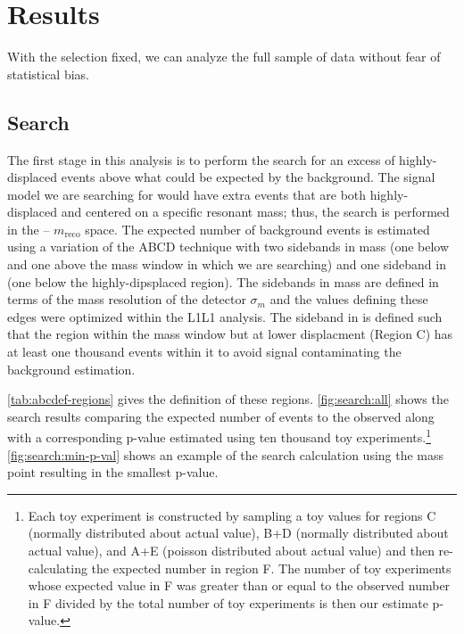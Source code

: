 \section{Results}
With the selection fixed, we can analyze the full sample of data without fear of
statistical bias.

\subsection{Search}
The first stage in this analysis is to perform the search for an excess of highly-displaced
events above what could be expected by the background.
The signal model we are searching for would have extra events that are both highly-displaced
and centered on a specific resonant mass; thus, the search is performed in the \minyzero -- $m_\mathrm{reco}$
space.
The expected number of background events is estimated using a variation of the ABCD technique
with two sidebands in mass (one below and one above the mass window in which we are searching)
and one sideband in \minyzero (one below the highly-dipsplaced region).
The sidebands in mass are defined in terms of the mass resolution of the detector $\sigma_m$
and the values defining these edges were optimized within the L1L1 analysis.
The sideband in \minyzero is defined such that the region within the mass window but
at lower displacment (Region C) has at least one thousand events within it to avoid signal contaminating
the background estimation.

\cref{tab:abcdef-regions} gives the definition of these regions.
\cref{fig:search:all} shows the search results comparing the expected number of events to the
observed along with a corresponding p-value estimated using ten thousand toy experiments.\footnote{
  Each toy experiment is constructed by sampling a toy values for regions C (normally distributed about actual value),
  B+D (normally distributed about actual value), and A+E (poisson distributed about actual value) and
  then re-calculating the expected number in region F. The number of toy experiments whose expected
  value in F was greater than or equal to the observed number in F divided by the total number of
  toy experiments is then our estimate p-value.
}
\cref{fig:search:min-p-val} shows an example of the search calculation using the mass point resulting
in the smallest p-value.


